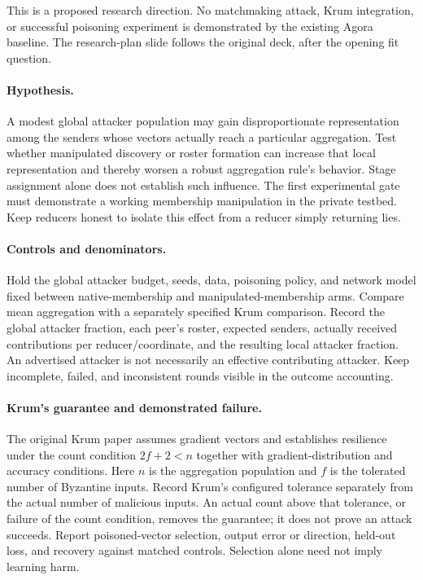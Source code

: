 This is a proposed research direction. No matchmaking attack, Krum integration,
or successful poisoning experiment is demonstrated by the existing Agora baseline.
The research-plan slide follows the original deck, after the opening fit question.

\paragraph{Hypothesis.}
A modest global attacker population may gain disproportionate representation
among the senders whose vectors actually reach a particular aggregation.
Test whether manipulated discovery or roster formation can increase that local
representation and thereby worsen a robust aggregation rule's behavior.
Stage assignment alone does not establish such influence. The first experimental
gate must demonstrate a working membership manipulation in the private testbed.
Keep reducers honest to isolate this effect from a reducer simply returning lies.

\paragraph{Controls and denominators.}
Hold the global attacker budget, seeds, data, poisoning policy, and network model
fixed between native-membership and manipulated-membership arms. Compare mean
aggregation with a separately specified Krum comparison. Record the global
attacker fraction, each peer's roster, expected senders, actually received
contributions per reducer/coordinate, and the resulting local attacker fraction.
An advertised attacker is not necessarily an effective contributing attacker.
Keep incomplete, failed, and inconsistent rounds visible in the outcome accounting.

\paragraph{Krum's guarantee and demonstrated failure.}
The original Krum paper assumes gradient vectors and establishes resilience under
the count condition $2f+2<n$ together with gradient-distribution and accuracy
conditions. Here $n$ is the aggregation population and $f$ is the tolerated number
of Byzantine inputs. Record Krum's configured tolerance separately from the actual
number of malicious inputs. An actual count above that tolerance, or failure of
the count condition, removes the guarantee; it does not prove an attack succeeds.
Report poisoned-vector selection, output error or direction, held-out loss, and
recovery against matched controls. Selection alone need not imply learning harm.

